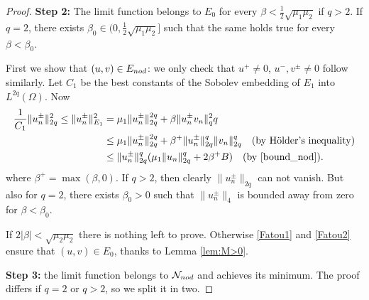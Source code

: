 \documentclass[10pt,a4paper]{amsart}
\numberwithin{equation}{section}
\begin{document}
\begin{proof}
\noindent\textbf{Step 2:} The limit function belongs to $E_0$ for every
$\beta <\frac{1}{2}\sqrt{\mu_1\mu_2}$ if $q>2$.
If $q=2$, there exists $\beta_0\in (0,\frac{1}{2}\sqrt{\mu_1\mu_2}]$ such that the
same holds true  for every $\beta <\beta_0$.

First we  show that $(u,v)\in E_{\rm nod}$: we only check that
$u^+\neq 0$, $u^-,v^{\pm}\neq 0$ follow similarly.
Let $C_1$ be the best constants of the Sobolev embedding of $E_1$ into
$L^{2q}(\Omega)$.
 Now
\begin{align*}
 \frac{1}{C_1} \|u^{\pm}_n\|_{2q}^2 \le \|u^{\pm}_n\|_{E_1}^2
&=\mu_1 \|u^{\pm}_n\|_{2q}^{2q} + \beta \|u^{\pm}_nv_n\|_q^2q \\
&\leq  \mu_1 \|u^{\pm}_n\|_{2q}^{2q} + \beta^+ \|u^{\pm}_n\|_{2q}^q\|v_n\|_{2q}^q
 \quad\text{(by H\"older's inequality)} \\
&\leq \|u^{\pm}_n\|_{2q}^q (\mu_1 \|u_n\|_{2q}^q + 2\beta^+ B ) \quad
 \text{(by \eqref{bound_nod})}.
\end{align*}
where $\beta^+=\max(\beta,0)$.
If $q>2$, then clearly $\|u^{\pm}_n\|_{2q}$ can not vanish.
 But also for $q=2$,  there exists $\beta_0>0$ such that
$\|u^{\pm}_n\|_{4}$ is bounded away from zero for $\beta <\beta_0$.

If $2|\beta|<\sqrt{\mu_2\mu_2}$ there is nothing left to prove.
 Otherwise  \eqref{Fatou1} and \eqref{Fatou2} ensure that $(u,v)\in E_0$,
thanks to Lemma \ref{lem:M>0}.
\smallskip

\noindent\textbf{Step 3:} the limit function  belongs to
$\mathcal N_{\rm nod}$ and achieves its minimum.
The proof differs if $q=2$ or $q>2$, so we split it in two.
\smallskip


\end{proof}
\end{document}
